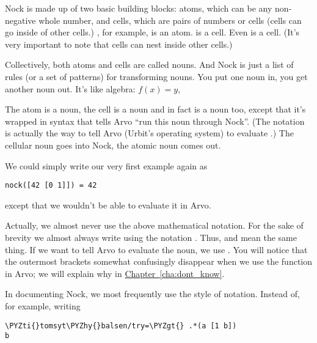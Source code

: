 Nock is made up of two basic building blocks: atoms, which can be any
non-negative whole number, and cells, which are pairs of numbers or cells
(cells can go inside of other cells.) , for example, is an atom. \kode{[0 1]} is
a cell. Even \kode{[42 [0 1]]} is a cell. (It's very important to note that cells
can nest inside other cells.)

Collectively, both atoms and cells are called nouns. And Nock is just a list of
rules (or a set of patterns) for transforming nouns.  You put one noun in, you
get another noun out. It's like algebra: \( f(x) = y \), 

The atom  is a noun, the cell \kode{[0 1]} is a noun and in fact 
is a noun too, except that it's wrapped in syntax that tells Arvo ``run
this noun through Nock''. (The notation  is actually the way to tell Arvo
(Urbit's operating system) to evaluate .) The cellular noun
\kode{[42 [0 1]]} goes into Nock, the atomic noun  comes out.

We could simply write our very first example again as

\begin{framed_shaded}
\begin{Verbatim}[fontsize=\relsize{-2.5},commandchars=\\\{\}]
nock([42 [0 1]]) = 42
\end{Verbatim}
\end{framed_shaded}
except that we wouldn't be able to evaluate it in Arvo.

Actually, we almost never use the above mathematical notation. For the sake of
brevity we almost always write  using the notation . Thus,  and \kode{*[42 [0 1]]} mean the same thing. If we want to tell Arvo to evaluate
the noun, we use . You will notice that the outermost brackets
somewhat confusingly disappear when we use the  function in Arvo; we will
explain why in \hyperref[cha:dont_know]{Chapter~\ref{cha:dont_know}}.

In documenting Nock, we most frequently use the \kode{*[42 [0 1]]} style of
notation. Instead of, for example, writing

\begin{framed_shaded}
\begin{Verbatim}[fontsize=\relsize{-2.5},commandchars=\\\{\}]
\PYZti{}tomsyt\PYZhy{}balsen/try=\PYZgt{} .*(a [1 b])
b
\end{Verbatim}
\end{framed_shaded}

